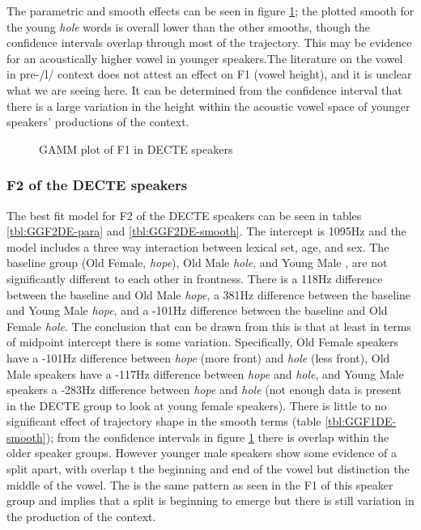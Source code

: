 \documentclass[../../../00.FullDoc/tex/Thesis]{subfiles}
\begin{document}
The parametric and smooth effects can be seen in figure \ref{fig:GGF1DE}; the plotted smooth for the young \textit{hole} words is overall lower than the other smooths, though the confidence intervals overlap through most of the trajectory. This may be evidence for an acoustically higher \hole{} vowel in younger speakers.The literature on the \goat{} vowel in pre-/l/ context does not attest an effect on F1 (vowel height), and it is unclear what we are seeing here. It can be determined from the confidence interval that there is a large variation in the height within the acoustic vowel space of younger speakers' productions of the \hole{} context.

\begin{figure}[h]
	
	\caption{GAMM plot of F1 in DECTE speakers} \label{fig:GGF1DE}
\end{figure}

\subsubsection{F2 of the DECTE speakers}
The best fit model for F2 of the DECTE speakers can be seen in tables \ref{tbl:GGF2DE-para} and \ref{tbl:GGF2DE-smooth}. The intercept is 1095Hz and the model includes a three way interaction between lexical set, age, and sex. The baseline group (Old Female, \textit{hope}), Old Male \textit{hole}, and Young Male \hole{}, are not significantly different to each other in frontness. There is a 118Hz difference between the baseline and Old Male \textit{hope}, a 381Hz difference between the baseline and Young Male \textit{hope}, and a -101Hz difference between the baseline and Old Female \textit{hole}. The conclusion that can be drawn from this is that at least in terms of midpoint intercept there is some variation. Specifically, Old Female speakers have a -101Hz difference between \textit{hope} (more front) and \textit{hole} (less front), Old Male speakers have a -117Hz difference between \textit{hope} and \textit{hole}, and Young Male speakers a -283Hz difference between \textit{hope} and \textit{hole} (not enough data is present in the DECTE group to look at young female speakers).
There is little to no significant effect of trajectory shape in the smooth terms (table \ref{tbl:GGF1DE-smooth}); from the confidence intervals in figure \ref{fig:GGF1DE} there is overlap within the older speaker groups. However younger male speakers show some evidence of a split apart, with overlap t the beginning and end of the vowel but distinction the middle of the vowel. The is the same pattern as seen in the F1 of this speaker group and implies that a \GG{} split is beginning to emerge but there is still variation in the production of the \hole{} context.
\end{document}
